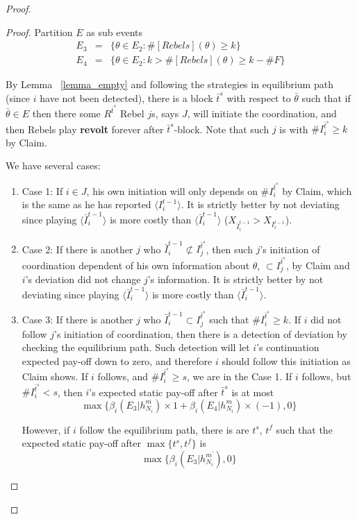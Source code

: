 \documentclass[12pt,letter]{article}
\theoremstyle{definition}
\theoremstyle{remark}
\theoremstyle{claim}
\begin{document}
\begin{proof}
\begin{proof}
Partition $E$ as sub events
\begin{eqnarray*}
E_3 	&= &\{\theta\in E_2: \#[Rebels](\theta)\geq k\}\\
E_4 	&= &\{\theta\in E_2: k>\#[Rebels](\theta)\geq k-\#F\}
\end{eqnarray*}

By Lemma ~\ref{lemma_empty} and following the strategies in equilibrium path (since $i$ have not been detected), there is a block $\bar{t}^{s}$ with respect to $\bar{\theta}$ such that if $\bar{\theta}\in E$ then there some $R^{\bar{t}^s}$ Rebel $j$s, says $J$, will initiate the coordination, and then Rebels play \textbf{revolt} forever after $\bar{t}^s$-block. Note that such $j$ is with $\# {I}^{\bar{t}^{s}}_i \geq k$ by Claim.

We have several cases:
\begin{enumerate}
\item Case 1: If $i\in J$, his own initiation will only depends on $\# I^{\bar{t}^s}_i$ by Claim, which is the same as he has reported $\langle {I}^{t-1}_i\rangle$. It is strictly better by not deviating since playing $\langle\bar{I}^{t-1}_i\rangle$ is more costly than $\langle\bar{I}^{t-1}_i\rangle$ ($X_{\bar{I}^{t-1}_i}>X_{I^{t-1}_i}$).
\item Case 2: If there is another $j$ who $\bar{I}^{t-1}_i\not\subset I^{\bar{t}^{s}}_j$, then such $j$'s initiation of coordination dependent of his own information about $\theta$, $\subset I^{\bar{t}^{s}}_j$, by Claim and $i$'s deviation did not change $j$'s information. It is strictly better by not deviating since playing $\langle\bar{I}^{t-1}_i\rangle$ is more costly than $\langle\bar{I}^{t-1}_i\rangle$.
\item Case 3: If there is another $j$ who $\bar{I}^{t-1}_i\subset {I}^{\bar{t}^{s}}_j$ such that $\# I^{\bar{t}^s}_i\geq k$. If $i$ did not follow $j$'s initiation of coordination, then there is a detection of deviation by checking the equilibrium path. Such detection will let $i$'s continuation expected pay-off down to zero, and therefore $i$ should follow this initiation as Claim shows. If $i$ follows, and $\#I^{\bar{t}^s}_i\geq s$, we are in the Case 1. If $i$ follows, but $\#I^{\bar{t}^s}_i< s$, then $i$'s expected static pay-off after $\bar{t}^{s}$ is at most
\[
{\max\{\beta_{i}(E_3|h^{m}_{N_i})\times 1+\beta_{i}(E_4|h^{m}_{N_i})\times (-1), 0\}}
\]

However, if $i$ follow the equilibrium path, there is are $t^s$, $t^f$ such that the expected static pay-off after $\max\{t^s,t^f\}$ is
\[\max\{\beta_{i}(E_3|h^{m^{'}}_{N_i}),0\}\]


\end{enumerate}
\end{proof}
\end{proof}
\end{document}
